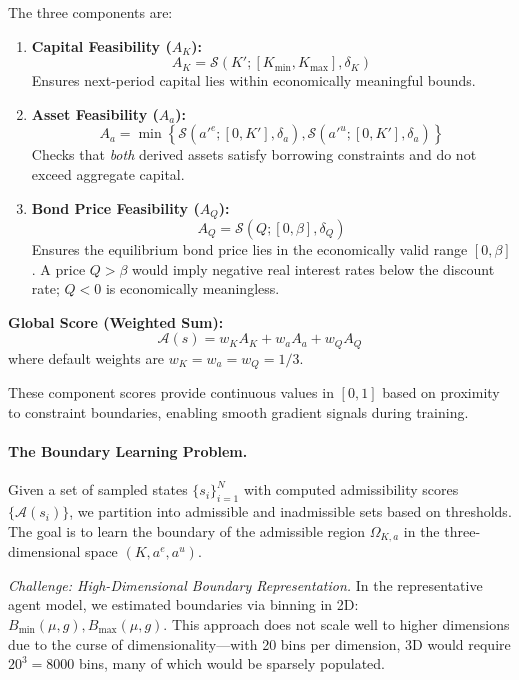 The three components are:
\begin{enumerate}
    \item \textbf{Capital Feasibility ($A_K$):}
    \begin{equation}
        A_K = \mathcal{S}(K'; [K_{\min}, K_{\max}], \delta_K)
    \end{equation}
    Ensures next-period capital lies within economically meaningful bounds.
    
    \item \textbf{Asset Feasibility ($A_a$):}
    \begin{equation}
        A_a = \min\left\{ \mathcal{S}(a'^e; [0, K'], \delta_a), \mathcal{S}(a'^u; [0, K'], \delta_a) \right\}
    \end{equation}
    Checks that \emph{both} derived assets satisfy borrowing constraints and do not exceed aggregate capital.
    
    \item \textbf{Bond Price Feasibility ($A_Q$):}
    \begin{equation}
        A_Q = \mathcal{S}(Q; [0, \beta], \delta_Q)
    \end{equation}
    Ensures the equilibrium bond price lies in the economically valid range $[0, \beta]$. A price $Q > \beta$ would imply negative real interest rates below the discount rate; $Q < 0$ is economically meaningless.
\end{enumerate}

\textbf{Global Score (Weighted Sum):}
\begin{equation}
    \mathcal{A}(s) = w_K A_K + w_a A_a + w_Q A_Q
\end{equation}
where default weights are $w_K = w_a = w_Q = 1/3$.

These component scores provide continuous values in $[0, 1]$ based on proximity to constraint boundaries, enabling smooth gradient signals during training.


\paragraph{The Boundary Learning Problem.}
Given a set of sampled states $\{s_i\}_{i=1}^N$ with computed admissibility scores $\{\mathcal{A}(s_i)\}$, we partition into admissible and inadmissible sets based on thresholds. The goal is to learn the boundary of the admissible region $\Omega_{K,a}$ in the three-dimensional space $(K, a^e, a^u)$.

\textit{Challenge: High-Dimensional Boundary Representation.}
In the representative agent model, we estimated boundaries via binning in 2D: $B_{\min}(\mu, g), B_{\max}(\mu, g)$. This approach does not scale well to higher dimensions due to the curse of dimensionality---with 20 bins per dimension, 3D would require $20^3 = 8000$ bins, many of which would be sparsely populated.


